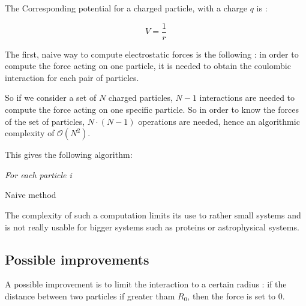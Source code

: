 \documentclass[12pt,twoside,a4paper]{report}
\begin{document}
The Corresponding potential for a charged particle, with a charge $q$ is :

\begin{equation}
	V = \frac{1}{r}
	\label{potential}
\end{equation}



The first, naive way to compute electrostatic forces is the following : in order to compute the force acting on one particle, it is needed to obtain the coulombic interaction for each pair of particles.

So if we consider a set of $N$ charged particles, $N-1$ interactions are needed to compute the force acting on one specific particle. So in order to know the forces of the set of particles, $N\cdot(N-1)$ operations are needed, hence an algorithmic complexity of $\mathcal{O}(N^2)$.

This gives the following algorithm:



\IncMargin{1em}
\begin{algorithm}[H]



\BlankLine

\emph{For each particle i}\;
\caption{Naive method}\label{algo_disjdecomp}
\end{algorithm}\DecMargin{1em}


The complexity of such a computation limits its use to rather small systems and is not really usable for bigger systems such as proteins or astrophysical systems.


\subsection{Possible improvements}

A possible improvement is to limit the interaction to a certain radius : if the distance between two particles if greater tham $R_0$, then the force is set to $0$.
\end{document}
